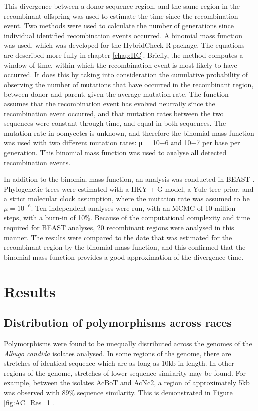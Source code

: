 This divergence between a donor sequence region, and the same region in the recombinant offspring was used to estimate the time since the recombination event. Two methods were used to calculate the number of generations since individual identified recombination events occurred. A binomial mass function was used, which was developed for the HybridCheck R package. The equations are described more fully in chapter \ref{chap:HC}. Briefly, the method computes a window of time, within which the recombination event is most likely to have occurred. It does this by taking into consideration the cumulative probability of observing the number of mutations that have occurred in the recombinant region, between donor and parent, given the average mutation rate. The function assumes that the recombination event has evolved neutrally since the recombination event occurred, and that mutation rates between the two sequences were constant through time, and equal in both sequences. The mutation rate in oomycetes is unknown, and therefore the binomial mass function was used with two different mutation rates: μ = 10−6 and 10−7 per base per generation. This binomial mass function was used to analyse all detected recombination events.

In addition to the binomial mass function, an analysis was conducted in BEAST \parencite{Drummond2007BEAST:Trees}. Phylogenetic trees were estimated with a HKY + G model, a Yule tree prior, and a strict molecular clock assumption, where the mutation rate was assumed to be $\mu = 10^{−6}$. Ten independent analyses were run, with an MCMC of 10 million steps, with a burn-in of 10\%. Because of the computational complexity and time required for BEAST analyses, 20 recombinant regions were analysed in this manner. The results were compared to the date that was estimated for the recombinant region by the binomial mass function, and this confirmed that the binomial mass function provides a good approximation of the divergence time.


\section{Results}
\subsection{Distribution of polymorphisms across races}
Polymorphisms were found to be unequally distributed across the genomes of the \textit{Albugo candida} isolates analysed. In some regions of the genome, there are stretches of identical sequence which are as long as 10kb in length. In other regions of the genome, stretches of lower sequence similarity may be found. For example, between the isolates AcBoT and AcNc2, a region of approximately 5kb was observed with 89\% sequence similarity. This is demonstrated in Figure \ref{fig:AC_Res_1}.


